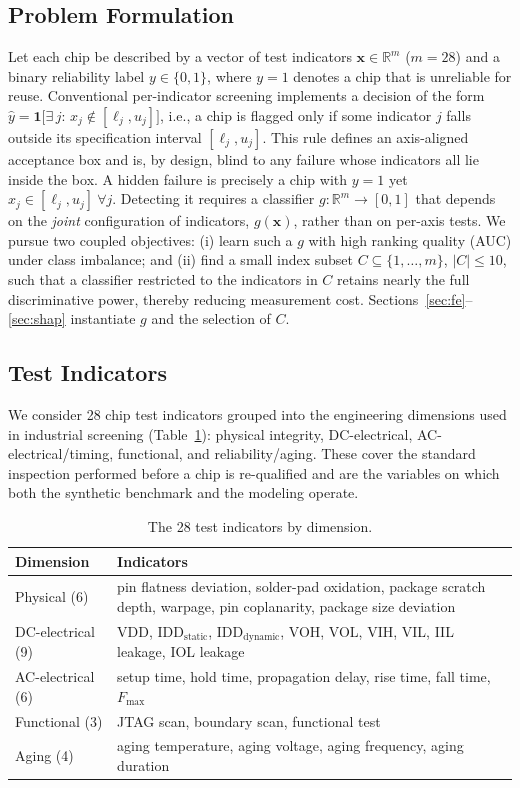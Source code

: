 \documentclass[electronics,article,submit,pdftex,moreauthors]{Definitions/mdpi}
\begin{document}
\subsection{Problem Formulation}
Let each chip be described by a vector of test indicators $\mathbf{x}\in\mathbb{R}^{m}$ ($m{=}28$) and a binary reliability label $y\in\{0,1\}$, where $y{=}1$ denotes a chip that is unreliable for reuse. Conventional per-indicator screening implements a decision of the form $\hat{y}=\mathbf{1}\big[\exists\, j:\, x_j\notin[\ell_j,u_j]\big]$, i.e., a chip is flagged only if some indicator $j$ falls outside its specification interval $[\ell_j,u_j]$. This rule defines an axis-aligned acceptance box and is, by design, blind to any failure whose indicators all lie inside the box. A hidden failure is precisely a chip with $y{=}1$ yet $x_j\in[\ell_j,u_j]\ \forall j$. Detecting it requires a classifier $g:\mathbb{R}^{m}\!\rightarrow[0,1]$ that depends on the \emph{joint} configuration of indicators, $g(\mathbf{x})$, rather than on per-axis tests. We pursue two coupled objectives: (i) learn such a $g$ with high ranking quality (AUC) under class imbalance; and (ii) find a small index subset $C\subseteq\{1,\dots,m\}$, $|C|\le 10$, such that a classifier restricted to the indicators in $C$ retains nearly the full discriminative power, thereby reducing measurement cost. Sections~\ref{sec:fe}--\ref{sec:shap} instantiate $g$ and the selection of $C$.

\subsection{Test Indicators}
We consider 28 chip test indicators grouped into the engineering dimensions used in industrial screening (Table~\ref{tab:indicators}): physical integrity, DC-electrical, AC-electrical/timing, functional, and reliability/aging. These cover the standard inspection performed before a chip is re-qualified and are the variables on which both the synthetic benchmark and the modeling operate.

\begin{table}[H]
\caption{The 28 test indicators by dimension.}
\label{tab:indicators}
\begin{tabularx}{\textwidth}{lX}
\toprule
\textbf{Dimension} & \textbf{Indicators}\\
\midrule
Physical (6) & pin flatness deviation, solder-pad oxidation, package scratch depth, warpage, pin coplanarity, package size deviation\\
DC-electrical (9) & VDD, IDD$_{\text{static}}$, IDD$_{\text{dynamic}}$, VOH, VOL, VIH, VIL, IIL leakage, IOL leakage\\
AC-electrical (6) & setup time, hold time, propagation delay, rise time, fall time, $F_{\max}$\\
Functional (3) & JTAG scan, boundary scan, functional test\\
Aging (4) & aging temperature, aging voltage, aging frequency, aging duration\\
\bottomrule
\end{tabularx}
\end{table}
\end{document}
